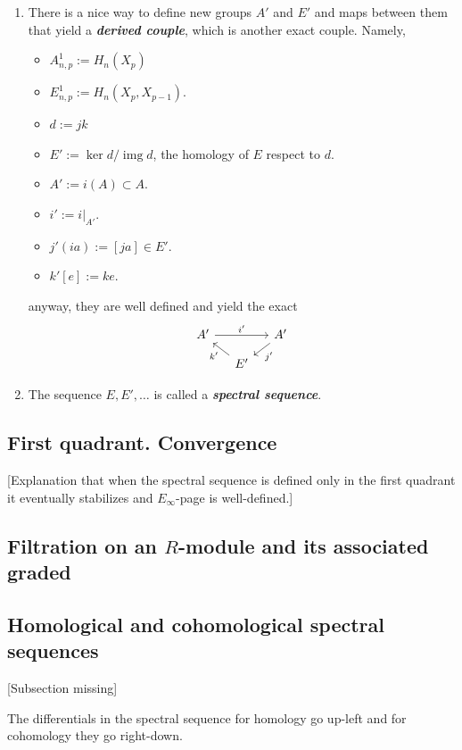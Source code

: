 \begin{enumerate}
	\item There is a nice way to define new groups $A'$ and $E'$ and maps between them that yield a \textit{\textbf{derived couple}}, which is another exact couple.	Namely,
		\begin{itemize}
			\item $A^1_{n,p}:=H_n(X_p)$
			\item $E^1_{n,p}:=H_n(X_p,X_{p-1})$.
			\item $d:=jk$
			\item $E':=\operatorname{ker} d/\operatorname{img}d$, the homology of $E$ respect to $d$.
			\item $A':=i(A)\subset A$.
			\item $i':=i|_{A'}$.
			\item $j'(ia):=[ja]\in E'$.
			\item $k'[e]:=ke$.
		\end{itemize}
	anyway, they are well defined and yield the exact
	\[\begin{tikzcd}[column sep=small,row sep=small]
		A'\arrow[rr,"i'"]&&A'\arrow[dl,"j'"]\\
		&E'\arrow[ul,"k'"]
	\end{tikzcd}\]

	\item The sequence $E,E',\ldots$ is called a \textit{\textbf{spectral sequence}}.
\end{enumerate}

\subsection*{First quadrant. Convergence}

[Explanation that when the spectral sequence is defined only in the first quadrant it eventually stabilizes and $E_{\infty}$-page is well-defined.]

\subsection*{Filtration on an \texorpdfstring{$R$}{R}-module and its associated graded}

\subsection*{Homological and cohomological spectral sequences}

[Subsection missing]

\begin{remark}
	The differentials in the spectral sequence for homology go up-left and for cohomology they go right-down.
\end{remark}

